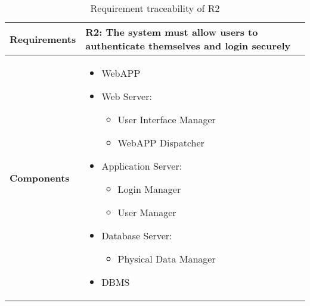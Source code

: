 \begin{table}[h!]
    \centering
    \begin{tabular}{|p{3cm}|p{12cm}|}    \hline
        \textbf{Requirements} & R2: The system must allow users to authenticate themselves and login securely \\
    \hline
        \textbf{Components} & 
            \begin{itemize}
                \item WebAPP
                \item Web Server:
                \begin{itemize}
                    \item User Interface Manager 
                    \item WebAPP Dispatcher
                \end{itemize}
                \item Application Server:
                \begin{itemize} 
                    \item Login Manager
                    \item User Manager
                \end{itemize}
                \item Database Server:
                 \begin{itemize}
                    \item Physical Data Manager
                \end{itemize}
                \item DBMS
            \end{itemize}    \\
        
    \hline
    \end{tabular}
    \caption{Requirement traceability of R2}
    \label{tab:r2}
\end{table}


